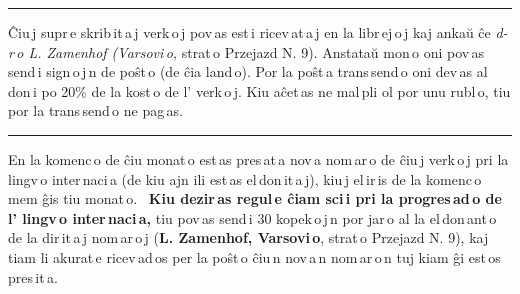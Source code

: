 \thispagestyle{plain}

{\centering\rule{3cm}{0.4pt}\par}

Ĉiu\,j supr\,e skrib\,it\,a\,j verk\,o\,j pov\,as est\,i ricev\,at\,a\,j en la libr\,ej\,o\,j kaj ankaŭ ĉe {\sansfont\textit{d-r\,o L. Zamenhof (Varsovi\thinspace{}\,\thinspace{}o,}} strat\,o Przejazd N. 9). Anstataŭ mon\,o oni pov\,as send\,i sign\,o\,j\,n de poŝt\,o (de ĉia land\,o). Por la poŝt\,a trans\,send\,o oni dev\,as al\,don\,i po 20\% de la kost\,o de l’ verk\,o\,j. Kiu aĉet\,as ne mal\,pli ol por unu rubl\,o, tiu por la trans\,send\,o ne pag\,as.

{\centering\rule{3cm}{0.4pt}\par}

En la komenc\,o de ĉiu monat\,o est\,as pres\,at\,a nov\,a nom\,ar\,o de ĉiu\,j verk\,o\,j pri la lingv\,o inter\,naci\,a (de kiu ajn ili est\,as el\,don\,it\,a\,j), kiu\,j el\,ir\,is de la komenc\,o mem ĝis tiu monat\,o. \leftpointright{}~{\didone\bf Kiu dezir\,as regul\,e ĉiam sci\,i pri la progres\,ad\,o de l’ lingv\,o inter\,naci\,a,}\rightpointleft{} tiu pov\,as send\,i 30 kopek\,o\,j\,n por jar\,o al la el\,don\,ant\,o de la dir\,it\,a\,j nom\,ar\,o\,j ({\didone\bf L. Zamenhof, Varsovi\,o}, strat\,o Przejazd N. 9), kaj tiam li akurat\,e ricev\,ad\,os per la poŝt\,o ĉiu\,n nov\,a\,n nom\,ar\,o\,n tuj kiam ĝi est\,os pres\,it\,a.

{\centering{}\par}

\normalsize
\newpage